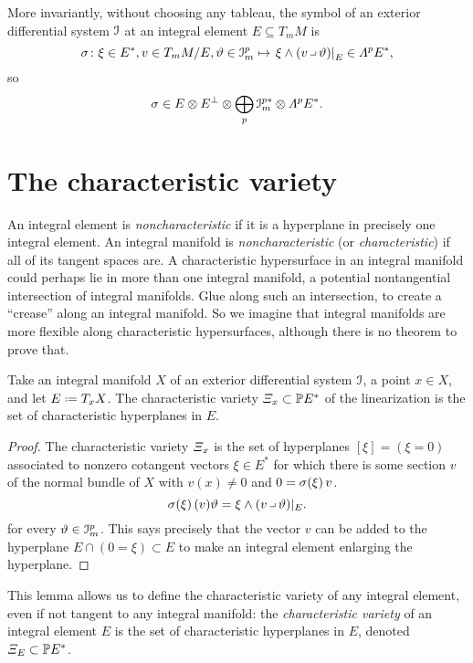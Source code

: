 More invariantly, without choosing any tableau, the symbol of an exterior differential system \(\mathcal{I}\) at an integral element \(E\subseteq T_m M\) is
\[
\opsymbol{} \colon \xi \in E^*, v \in T_m M/E, \vartheta\in\II_m^p \mapsto 
\left.\xi\wedge(v\hook\vartheta)\right|_E\in\Lm{p}{E}^*,
\]
so 
\[
\opsymbol{}\in E\otimes E^{\perp}\otimes\bigoplus_p\II_m^{p*}\otimes\Lm{p}{E}^*.
\]

\section{The characteristic variety}
An integral element is \emph{noncharacteristic} if it is a hyperplane in precisely one integral element.
An integral manifold is \emph{noncharacteristic} (or \emph{characteristic}) if all of its tangent spaces are.
A characteristic hypersurface in an integral manifold could perhaps lie in more than one integral manifold, a potential nontangential intersection of integral manifolds.
Glue along such an intersection, to create a ``crease'' along an integral manifold.
So we imagine that integral manifolds are more flexible along characteristic hypersurfaces, although there is no theorem to prove that.
\begin{lemma}\label{lemma:char.var}
Take an integral manifold \(X\) of an exterior differential system \(\mathcal{I}\), a point \(x \in X\), and let \(E\defeq T_x X\).
The characteristic variety 
\(
\CV_x \subset \Proj(E^*)
\)
of the linearization is the set of characteristic hyperplanes in \(E\).
\end{lemma}
\begin{proof}
The characteristic variety \(\CV_x\) is the set of hyperplanes \([\xi]=(\xi=0)\) associated to nonzero cotangent vectors \(\xi \in E^*\) for which there is some section \(v\) of the normal bundle of \(X\) with \(v(x)\ne 0\) and \(0=\opsymbol[]{\xi}v\).
\[
\opsymbol[]{\xi}(v)\vartheta=\xi \wedge (v \hook \vartheta)|_E.
\]
for every \(\vartheta \in \mathcal{I}^p_m\).
This says precisely that the vector \(v\) can be added to the hyperplane \(E\cap (0=\xi) \subset E\) to make an integral element enlarging the hyperplane.
\end{proof}
This lemma allows us to define the characteristic variety of any integral element, even if not tangent to any integral manifold: the \emph{characteristic variety} of an integral element \(E\) is the set of characteristic hyperplanes in \(E\), denoted \(\CV_E\subset \Proj(E^*)\).

